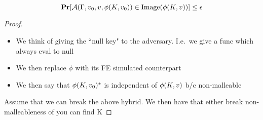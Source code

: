 \begin{lemma}
	\begin{equation*}
		\operatorname*{\mathbf{Pr}}[\mathcal{A}(\Gamma, v_0, v, \phi(K, v_0)) \in \text{Image}(\phi(K, v))] \leq \epsilon	
	\end{equation*}
	\begin{proof}
		\begin{itemize}
			\item We think of giving the ``null key" to the adversary. I.e.\ we give a func which always eval to null
			\item We then replace $\phi$ with its FE simulated counterpart
			\item We then say that $\phi(K, v_0)^*$ is independent of $\phi(K, v)$
			b/c non-malleable
		\end{itemize}
		Assume that we can break the above hybrid. We then have that either break non-malleableness of you can find K
	\end{proof}
\end{lemma}


